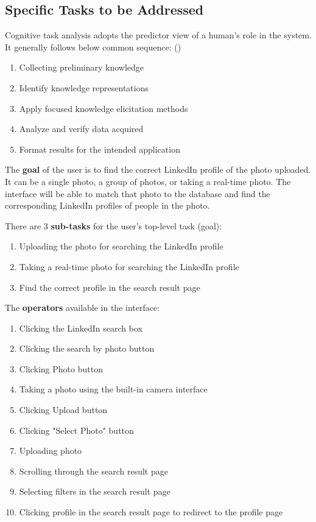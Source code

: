 \documentclass[
	letterpaper, %
]{jdf}
\begin{document}
\subsection{Specific Tasks to be Addressed}

Cognitive task analysis adopts the predictor view of a human's role in the system. It generally follows below common sequence: (\cite{joyner2016d})

\begin{enumerate}
	\item Collecting preliminary knowledge
	\item Identify knowledge representations
	\item Apply focused knowledge elicitation methods
	\item Analyze and verify data acquired
	\item Format results for the intended application
\end{enumerate}

The \textbf{goal} of the user is to find the correct LinkedIn profile of the photo uploaded. It can be a single photo, a group of photos, or taking a real-time photo. The interface will be able to match that photo to the database and find the corresponding LinkedIn profiles of people in the photo. 

There are 3 \textbf{sub-tasks} for the user's top-level task (goal):
\begin{enumerate}
	\item Uploading the photo for searching the LinkedIn profile
	\item Taking a real-time photo for searching the LinkedIn profile
	\item Find the correct profile in the search result page
\end{enumerate}

The \textbf{operators} available in the interface:
\begin{enumerate}
	\item Clicking the LinkedIn search box
	\item Clicking the search by photo button
	\item Clicking Photo button
	\item Taking a photo using the built-in camera interface
	\item Clicking Upload button
	\item Clicking "Select Photo" button
	\item Uploading photo
	\item Scrolling through the search result page
	\item Selecting filters in the search result page
	\item Clicking profile in the search result page to redirect to the profile page
\end{enumerate}
\end{document}
